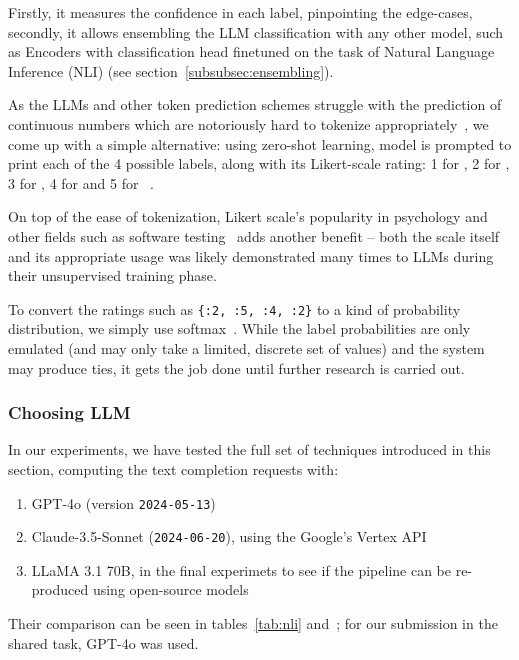 Firstly, it measures the confidence in each label, pinpointing the edge-cases, secondly, it allows ensembling the LLM classification with any other model, such as Encoders with classification head finetuned on the task of Natural Language Inference (NLI) (see section~\ref{subsubsec:ensembling}).

As the LLMs and other token prediction schemes struggle with the prediction of continuous numbers which are notoriously hard to tokenize appropriately~\cite{golkar2023xvalcontinuousnumberencoding}, we come up with a simple alternative: using zero-shot learning, model is prompted to print each of the 4 possible labels, along with its Likert-scale rating: 1 for , 2 for , 3 for , 4 for  and 5 for ~\cite{likert1932technique}.

On top of the ease of tokenization, Likert scale's popularity in psychology and other fields such as software testing~\cite{likertstudy} adds another benefit -- both the scale itself and its appropriate usage was likely demonstrated many times to LLMs during their unsupervised training phase.

To convert the ratings such as \texttt{\{:2, :5, :4, :2\}} to a kind of probability distribution, we simply use softmax~\cite{NIPS1989_0336dcba}.
While the label probabilities are only emulated (and may only take a limited, discrete set of values) and the system may produce ties, it gets the job done until further research is carried out.

\subsubsection{Choosing LLM}
In our experiments, we have tested the full set of techniques introduced in this section, computing the text completion requests with:
\begin{enumerate}
    \item GPT-4o (version \texttt{2024-05-13})
    \item Claude-3.5-Sonnet (\texttt{2024-06-20}), using the Google's Vertex API
    \item LLaMA 3.1 70B, in the final experimets to see if the pipeline can be re-produced using open-source models
\end{enumerate} 

Their comparison can be seen in tables~\ref{tab:nli} and~; for our submission in the \averitec{}  shared task, GPT-4o was used.
